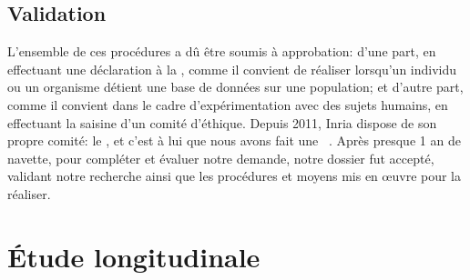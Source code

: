   \subsection{Validation}
    L'ensemble de ces procédures a dû être soumis à approbation: d'une part, en effectuant une déclaration à la , comme il convient de réaliser lorsqu'un individu ou un organisme détient une base de données sur une population; et d'autre part, comme il convient dans le cadre d'expérimentation avec des sujets humains, en effectuant la saisine d'un comité d'éthique. Depuis 2011, Inria dispose de son propre comité: le , et c'est à lui que nous avons fait une ~. Après presque 1 an de navette, pour compléter et évaluer notre demande, notre dossier fut accepté, validant notre recherche ainsi que les procédures et moyens mis en œuvre pour la réaliser.
\section{Étude longitudinale}
